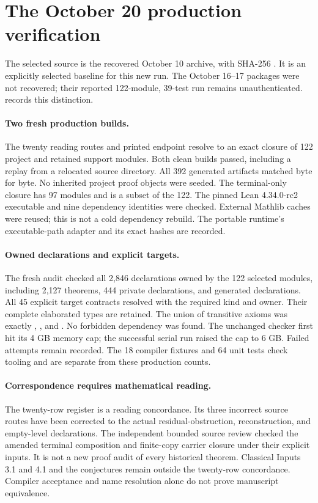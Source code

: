 \section{The October 20 production verification}
The selected source is the recovered October 10 archive, with SHA-256
.
It is an explicitly selected baseline for this new run. The October 16--17
packages were not recovered; their reported 122-module, 39-test run remains
unauthenticated. 
records this distinction.

\paragraph{Two fresh production builds.}
The twenty reading routes and printed endpoint resolve to an exact closure of
122 project and retained support modules. Both clean builds passed, including a
replay from a relocated source directory. All 392 generated artifacts matched
byte for byte. No inherited project proof objects were seeded. The terminal-only
closure has 97 modules and is a subset of the 122.
The pinned Lean 4.34.0-rc2 executable and nine dependency identities were checked.
External Mathlib caches were reused; this is not a cold dependency rebuild.
The portable runtime's executable-path adapter and its exact hashes are recorded.

\paragraph{Owned declarations and explicit targets.}
The fresh audit checked all 2,846 declarations owned by the 122 selected modules,
including 2,127 theorems, 444 private declarations, and generated declarations.
All 45 explicit target contracts resolved with the required kind and owner.
Their complete elaborated types are retained. The union of transitive axioms was
exactly , , and .
No forbidden dependency was found. The unchanged checker first hit its 4 GB
memory cap; the successful serial run raised the cap to 6 GB. Failed attempts remain recorded.
The 18 compiler fixtures and 64 unit tests check tooling and are separate from
these production counts.

\paragraph{Correspondence requires mathematical reading.}
The twenty-row register is a reading concordance. Its three incorrect source
routes have been corrected to the actual residual-obstruction, reconstruction,
and empty-level declarations. The independent bounded source review checked
the amended terminal composition and finite-copy carrier closure under their
explicit inputs. It is not a new proof audit of every historical theorem.
Classical Inputs 3.1 and 4.1 and the conjectures remain outside the twenty-row
concordance. Compiler acceptance and name resolution alone do not prove
manuscript equivalence.


